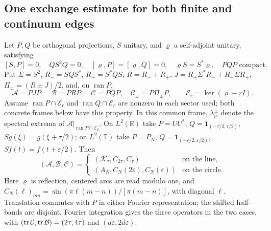 \subsection{One exchange estimate for both finite and continuum edges}
\label{app:exchange}\label{sec:exchange}
Let $P,Q$ be orthogonal projections, $S$ unitary, and $\varrho$ a
self-adjoint unitary, satisfying
\[
 [S,P]=0,\quad QS^2Q=0,\quad [\varrho,P]=[\varrho,Q]=0,\quad
 \varrho S=S^*\varrho,\quad PQP\text{ compact}.
\]
Put $\Sigma=S^2$, $R_-=SQS^*$, $R_+=S^*QS$,
$R=R_-+R_+$, $J=R_+\Sigma^*R_-+R_-\Sigma R_+$,
$\Pi_\pm=(R\pm J)/2$, and, on $\operatorname{ran}P$,
\[
 \mathcal A=PJP,\quad\mathcal B=PRP,\quad\mathcal C=PQP,\quad
\mathcal C_\pm=P\Pi_\pm P,\qquad \mathcal E_r=\ker(\varrho-rI).
\]
Assume $\operatorname{ran}P\cap\mathcal E_r$ and
$\operatorname{ran}Q\cap\mathcal E_r$ are nonzero in each sector used;
both concrete frames below have this property. In this common frame,
$\lambda_p^\pm$ denote the spectral extrema of
$\mathcal A|_{\operatorname{ran}P\cap\mathcal E_p}$.
On $L^2(\mathbb R)$ take $P=UU^*$,
$Q=\mathbf1_{(-\tau/2,\tau/2)}$, $Sg(\xi)=g(\xi+\tau/2)$;
on $L^2(\mathbb T)$ take $P=P_N$,
$Q=\mathbf1_{(-\varepsilon/2,\varepsilon/2)}$, $Sf(t)=f(t+\varepsilon/2)$.
Then
\begin{equation}\label{eq:T12:frame}
(\mathcal A,\mathcal B,\mathcal C)=
\begin{cases}(\mathcal K_\tau,C_{2\tau},C_\tau)&\text{on the line},\\
(A_N,C_N(2\varepsilon),C_N(\varepsilon))&\text{on the circle}.
\end{cases}
\end{equation}
Here $\varrho$ is reflection, centered arcs are read modulo one, and
$C_N(\ell)_{mn}=\sin(\pi\ell(m-n))/[\pi(m-n)]$, with diagonal $\ell$.
Translation commutes with $P$ in either Fourier representation;
the shifted half-bands are disjoint. Fourier integration gives the
three operators in the two cases, with
$(\operatorname{tr}\mathcal C,\operatorname{tr}\mathcal B)=(2\tau,4\tau)$ and
$(d\varepsilon,2d\varepsilon)$.

